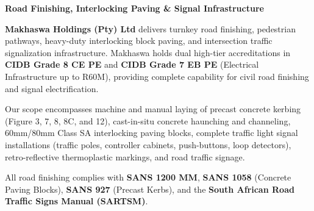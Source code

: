 \hypertarget{sec:kerbing}{}

\noindent
\begin{minipage}[t]{0.62\textwidth}
    \vspace{0pt}
    {\large\bfseries\color{mhnavy} Road Finishing, Interlocking Paving \& Signal Infrastructure}
    \vspace{0.12cm}

    {\fontsize{9pt}{13pt}\selectfont\color{mhtext}
    \textbf{Makhaswa Holdings (Pty) Ltd} delivers turnkey road finishing, pedestrian pathways, heavy-duty interlocking block paving, and intersection traffic signalization infrastructure. Makhaswa holds dual high-tier accreditations in \textbf{CIDB Grade 8 CE PE} and \textbf{CIDB Grade 7 EB PE} (Electrical Infrastructure up to R60M), providing complete capability for civil road finishing and signal electrification.
    }

    \vspace{0.22cm}

    {\fontsize{9pt}{13pt}\selectfont\color{mhtext}
    Our scope encompasses machine and manual laying of precast concrete kerbing (Figure 3, 7, 8, 8C, and 12), cast-in-situ concrete haunching and channeling, 60mm/80mm Class SA interlocking paving blocks, complete traffic light signal installations (traffic poles, controller cabinets, push-buttons, loop detectors), retro-reflective thermoplastic markings, and road traffic signage.
    }

    \vspace{0.22cm}

    {\fontsize{9pt}{13pt}\selectfont\color{mhtext}
    All road finishing complies with \textbf{SANS 1200 MM}, \textbf{SANS 1058} (Concrete Paving Blocks), \textbf{SANS 927} (Precast Kerbs), and the \textbf{South African Road Traffic Signs Manual (SARTSM)}.
    }
\end{minipage}
\hfill

